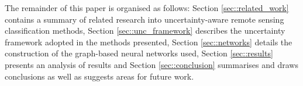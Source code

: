 \documentclass[journal]{IEEEtran}
\begin{document}
The remainder of this paper is organised as follows: Section \ref{sec::related_work} contains a summary of related research into uncertainty-aware remote sensing classification methods, Section \ref{sec::unc_framework} describes the uncertainty framework adopted in the methods presented, Section \ref{sec::networks} details the construction of the graph-based neural networks used, Section \ref{sec::results} presents an analysis of results and Section \ref{sec::conclusion} summarises and draws conclusions as well as suggests areas for future work.




%
%



%
%
\end{document}
